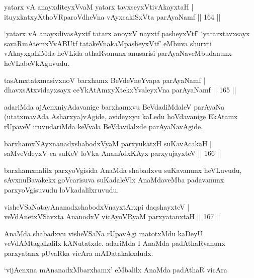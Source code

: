 \begin{shl}
yatarx vA anayxditeyxVvaM yatarx tavxseyxVtivAkayxtaH |\\
ituyxkatxyXthoVRparoVdheVna vAyxcakiSxVta parAyaNamf \hfill || 164 ||
\end{shl}

\begin{artha}%
`yatarx vA anayxdivasAyxtf tatarx anoyxV nayxtf pasheyxVtf' `yatarxtavxsayx savaRmAtemxYvABUtf tatakeVnakaMpasheyxVtf' eMbuva shurxti vAkayxgaLiMda heVLida athaRvanunx anusarisi parAyaNaveMbudanunx heVLabeVkAguvudu.
\end{artha}

\begin{shl}
tasAmxtatxmasivxnoV barxhamx BeVdeVneYvapa parAyaNamf |\\
dhavxsAtxvidayxsayx ceYkAtAmxyXtekxYvaleyxVna parAyaNamf \hfill || 165 ||
\end{shl}

\begin{artha}
adariMda ajAcnxniyAdavanige barxhamxvu BeVdadiMdaleV parAyaNa (utatxmavAda Asharxya)vAgide, avideyxyu kaLedu hoVdavanige EkAtamx rUpaveV iruvudariMda keVvala BeVdavilalxde parAyaNavAgide.
\end{artha}

\begin{shl}
barxhamxNAyxnanadxshabodxV\s yaM parxyukatxH suKavAcakaH |\\
saMveVdeyxV ca suKeV loVka AnanAdxKAyx parxyujayxteV \hfill || 166 ||
\end{shl}

\begin{artha}
barxhamxnalilx parxyoVgisida AnaMda shabadxvu suKavanunx heVLuvudu, sAvxnuBavakekx goVcarisuva suKadaleVlx AnaMdaveMba padavanunx parxyoVgisuvudu loVkadalilxruvudu.
\end{artha}

\begin{shl}
visheVSaNatayA\s \s nanadxshabodxV\s nayxtArxpi daqshayxteV |\\
veVdAnetxVSavxta AnanodxV vicAyoVR\s yaM parxyatanxtaH \hfill || 167 ||
\end{shl}

\begin{artha}
AnaMda shabadxvu visheVSaNa rUpavAgi matotxMdu kaDeyU veVdAMtagaLalilx kANutatxde. adariMda I AnaMda padAthaRvanunx parxyatanx pUvaRka vicAra mADatakakxdudx.
\end{artha}
\centerline{`vijAcnxna mAnanadxMbarxhamx' eMbalilx AnaMda padAthaR vicAra}

